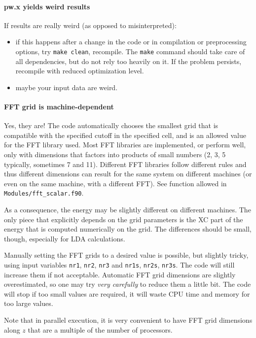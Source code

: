 \documentclass[12pt,a4paper]{article}
\begin{document}
\paragraph{pw.x yields weird results}
If results are really weird (as opposed to misinterpreted):
\begin{itemize}
\item if this happens after a change in the code or in compilation or
  preprocessing options, try \texttt{make clean}, recompile. The \texttt{make}
  command should take care of all dependencies, but do not rely too
  heavily on it. If the problem persists, recompile with
  reduced optimization level.  
\item maybe your input data are weird.
\end{itemize}

\paragraph{FFT grid is machine-dependent}
Yes, they are! The code automatically chooses the smallest grid that
is compatible with the 
specified cutoff in the specified cell, and is an allowed value for the FFT
library used. Most FFT libraries are implemented, or perform well, only
with dimensions that factors into products of small numbers (2, 3, 5 typically,
sometimes 7 and 11). Different FFT libraries follow different rules and thus
different dimensions can result for the same system on different machines (or
even on the same machine, with a different FFT). See function allowed in
\texttt{Modules/fft\_scalar.f90}.

As a consequence, the energy may be slightly different on different machines. 
The only piece that explicitly depends on the grid parameters is
the XC part of the energy that is computed numerically on the grid. The
differences should be small, though, especially for LDA calculations.

Manually setting the FFT grids to a desired value is possible, but slightly
tricky, using input variables \texttt{nr1}, \texttt{nr2}, \texttt{nr3} and 
\texttt{nr1s}, \texttt{nr2s}, \texttt{nr3s}. The
code will still increase them if not acceptable. Automatic FFT grid 
dimensions are slightly overestimated, so one may try {\em very carefully}
to reduce
them a little bit. The code will stop if too small values are required, it will
waste CPU time and memory for too large values.
    
Note that in parallel execution, it is very convenient to have FFT grid
dimensions along $z$ that are a multiple of the number of processors.
\end{document}
